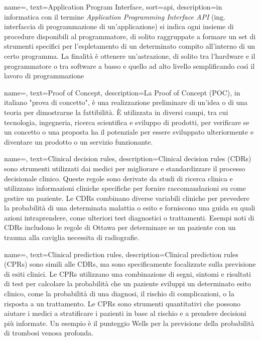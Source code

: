  {
    name=,
    text=Application Program Interface,
    sort=api,
    description={in informatica con il termine \emph{Application Programming Interface API} (ing. interfaccia di programmazione di un'applicazione) si indica ogni insieme di procedure disponibili al programmatore, di solito raggruppate a formare un set di strumenti specifici per l'espletamento di un determinato compito all'interno di un certo programma. La finalità è ottenere un'astrazione, di solito tra l'hardware e il programmatore o tra software a basso e quello ad alto livello semplificando così il lavoro di programmazione}
}

 {
    name=,
    text=Proof of Concept,
    description={La Proof of Concept (POC), in italiano "prova di concetto", è una realizzazione preliminare di un'idea o di una teoria per dimostrarne la fattibilità. È utilizzata in diversi campi, tra cui tecnologia, ingegneria, ricerca scientifica e sviluppo di prodotti, per verificare se un concetto o una proposta ha il potenziale per essere sviluppato ulteriormente e diventare un prodotto o un servizio funzionante.}
}

 {
    name=,
    text=Clinical decision rules,
    description={Clinical decision rules (CDRs) sono strumenti utilizzati dai medici per migliorare e standardizzare il processo decisionale clinico. Queste regole sono derivate da studi di ricerca clinica e utilizzano informazioni cliniche specifiche per fornire raccomandazioni su come gestire un paziente. Le CDRs combinano diverse variabili cliniche per prevedere la probabilità di una determinata malattia o esito e forniscono una guida su quali azioni intraprendere, come ulteriori test diagnostici o trattamenti. Esempi noti di CDRs includono le regole di Ottawa per determinare se un paziente con un trauma alla caviglia necessita di radiografie.}
}

 {
    name=,
    text=Clinical prediction rules,
    description={Clinical prediction rules (CPRs) sono simili alle CDRs, ma sono specificamente focalizzate sulla previsione di esiti clinici. Le CPRs utilizzano una combinazione di segni, sintomi e risultati di test per calcolare la probabilità che un paziente sviluppi un determinato esito clinico, come la probabilità di una diagnosi, il rischio di complicazioni, o la risposta a un trattamento. Le CPRs sono strumenti quantitativi che possono aiutare i medici a stratificare i pazienti in base al rischio e a prendere decisioni più informate. Un esempio è il punteggio Wells per la previsione della probabilità di trombosi venosa profonda.}
}

